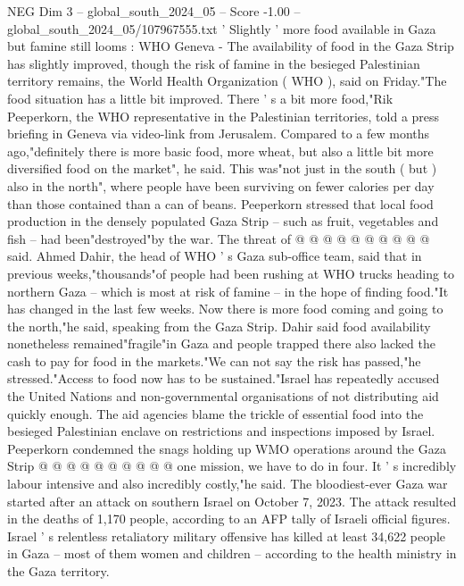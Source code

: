 \begin{textsample}{NEG Dim 3 – global\_south\_2024\_05 – Score -1.00 – global\_south\_2024\_05/107967555.txt}  \label{ex:f3_neg_362}
' Slightly ' more food available in Gaza but famine still looms : WHO Geneva - The availability of food in the Gaza Strip has slightly improved, though the risk of famine in the besieged Palestinian territory remains, the World Health Organization ( WHO ), said on Friday."The food situation has a little bit improved.
There ' s a bit more food,"Rik Peeperkorn, the WHO representative in the Palestinian territories, told a press briefing in Geneva via video-link from Jerusalem.
Compared to a few months ago,"definitely there is more basic food, more wheat, but also a little bit more diversified food on the market", he said.
This was"not just in the south ( but ) also in the north", where people have been surviving on fewer calories per day than those contained than a can of beans.
Peeperkorn stressed that local food production in the densely populated Gaza Strip -- such as fruit, vegetables and fish -- had been"destroyed"by the war.
The threat of @ @ @ @ @ @ @ @ @ @ said.
Ahmed Dahir, the head of WHO ' s Gaza sub-office team, said that in previous weeks,"thousands"of people had been rushing at WHO trucks heading to northern Gaza -- which is most at risk of famine -- in the hope of finding food."It has changed in the last few weeks.
Now there is more food coming and going to the north,"he said, speaking from the Gaza Strip.
Dahir said food availability nonetheless remained"fragile"in Gaza and people trapped there also lacked the cash to pay for food in the markets."We can not say the risk has passed,"he stressed."Access to food now has to be sustained."Israel has repeatedly accused the United Nations and non-governmental organisations of not distributing aid quickly enough.
The aid agencies blame the trickle of essential food into the besieged Palestinian enclave on restrictions and inspections imposed by Israel.
Peeperkorn condemned the snags holding up WMO operations around the Gaza Strip @ @ @ @ @ @ @ @ @ @ one mission, we have to do in four.
It ' s incredibly labour intensive and also incredibly costly,"he said.
The bloodiest-ever Gaza war started after an attack on southern Israel on October 7, 2023.
The attack resulted in the deaths of 1,170 people, according to an AFP tally of Israeli official figures.
Israel ' s relentless retaliatory military offensive has killed at least 34,622 people in Gaza -- most of them women and children -- according to the health ministry in the Gaza territory.

\end{textsample}
